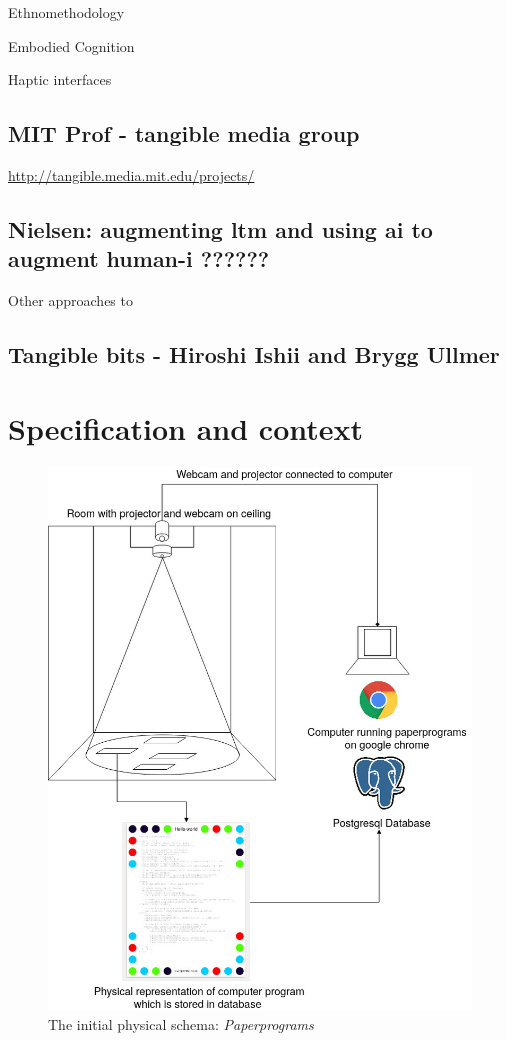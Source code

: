 \documentclass[12pt]{report}
\begin{document}
Ethnomethodology

Embodied Cognition

Haptic interfaces

\section{MIT Prof - tangible media group}
\label{sec:orga3e112a}
\url{http://tangible.media.mit.edu/projects/}
\section{Nielsen: augmenting ltm and using ai to augment human-i ??????}
\label{sec:orgf0ca617}

Other approaches to 

\cite{NielsenMich2018altm}

\cite{carter2017using}  

\section{Tangible bits - Hiroshi Ishii  and  Brygg Ullmer}
\label{sec:orgee569e3}
\cite{IshiiH2002Tbdt}

\chapter{Specification and context}
\label{sec:org6e7f0ef}

\begin{figure}[htbp]
\centering
\includegraphics[width=15cm]{assets/pp-diag.png}
\caption{The initial physical schema: \emph{Paperprograms} \label{pp-schema}}
\end{figure}
\end{document}
